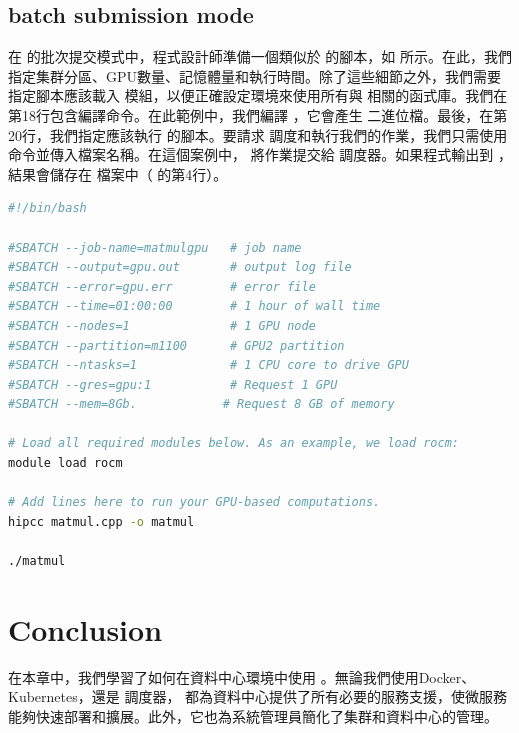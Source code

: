 \subsection{ batch submission mode}

在  的批次提交模式中，程式設計師準備一個類似於  的腳本，如  所示。在此，我們指定集群分區、GPU數量、記憶體量和執行時間。除了這些細節之外，我們需要指定腳本應該載入  模組，以便正確設定環境來使用所有與  相關的函式庫。我們在第18行包含編譯命令。在此範例中，我們編譯 ，它會產生  二進位檔。最後，在第20行，我們指定應該執行  的腳本。要請求  調度和執行我們的作業，我們只需使用  命令並傳入檔案名稱。在這個案例中， 將作業提交給  調度器。如果程式輸出到 ，結果會儲存在  檔案中（ 的第4行）。

\begin{lstlisting}[language=bash, caption={matmul.bash \term{SLURM} 批次提交腳本。}, captionpos=t, label={lst:slurm_job_example}]
#!/bin/bash

#SBATCH --job-name=matmulgpu   # job name
#SBATCH --output=gpu.out       # output log file
#SBATCH --error=gpu.err        # error file  
#SBATCH --time=01:00:00        # 1 hour of wall time
#SBATCH --nodes=1              # 1 GPU node
#SBATCH --partition=m1100      # GPU2 partition
#SBATCH --ntasks=1             # 1 CPU core to drive GPU
#SBATCH --gres=gpu:1           # Request 1 GPU
#SBATCH --mem=8Gb.            # Request 8 GB of memory

# Load all required modules below. As an example, we load rocm:
module load rocm

# Add lines here to run your GPU-based computations.
hipcc matmul.cpp -o matmul

./matmul
\end{lstlisting}

\section{Conclusion}

在本章中，我們學習了如何在資料中心環境中使用 。無論我們使用Docker、Kubernetes，還是  調度器， 都為資料中心提供了所有必要的服務支援，使微服務能夠快速部署和擴展。此外，它也為系統管理員簡化了集群和資料中心的管理。